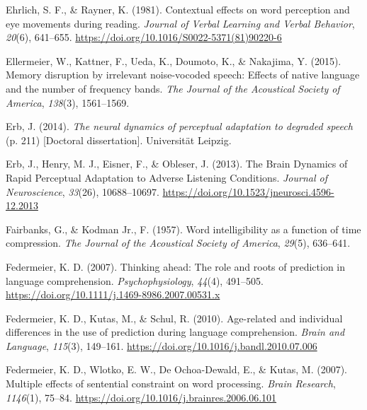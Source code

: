 \documentclass[a4paper, nobind]{templates/ociamthesis}
\newlength{\cslhangindent}
\newenvironment{CSLReferences}[2] %
 {%
  \setlength{\parindent}{0pt}
  \ifodd #1
  \let\oldpar\par
  \def\par{\hangindent=\cslhangindent\oldpar}
  \fi
  \setlength{\parskip}{1mm}
  \setlength{\baselineskip}{6mm}
 }%
 {}
\begin{document}
\begin{CSLReferences}{1}{0}
\leavevmode{}%
Ehrlich, S. F., \& Rayner, K. (1981). {Contextual effects on word perception and eye movements during reading}. \emph{Journal of Verbal Learning and Verbal Behavior}, \emph{20}(6), 641--655. \url{https://doi.org/10.1016/S0022-5371(81)90220-6}

\leavevmode{}%
Ellermeier, W., Kattner, F., Ueda, K., Doumoto, K., \& Nakajima, Y. (2015). Memory disruption by irrelevant noise-vocoded speech: Effects of native language and the number of frequency bands. \emph{The Journal of the Acoustical Society of America}, \emph{138}(3), 1561--1569.

\leavevmode{}%
Erb, J. (2014). \emph{{The neural dynamics of perceptual adaptation to degraded speech}} (p. 211) {[}Doctoral dissertation{]}. Universit{ä}t Leipzig.

\leavevmode{}%
Erb, J., Henry, M. J., Eisner, F., \& Obleser, J. (2013). The Brain Dynamics of Rapid Perceptual Adaptation to Adverse Listening Conditions. \emph{Journal of Neuroscience}, \emph{33}(26), 10688--10697. \url{https://doi.org/10.1523/jneurosci.4596-12.2013}

\leavevmode{}%
Fairbanks, G., \& Kodman Jr., F. (1957). {Word intelligibility as a function of time compression}. \emph{The Journal of the Acoustical Society of America}, \emph{29}(5), 636--641.

\leavevmode{}%
Federmeier, K. D. (2007). {Thinking ahead: The role and roots of prediction in language comprehension}. \emph{Psychophysiology}, \emph{44}(4), 491--505. \url{https://doi.org/10.1111/j.1469-8986.2007.00531.x}

\leavevmode{}%
Federmeier, K. D., Kutas, M., \& Schul, R. (2010). {Age-related and individual differences in the use of prediction during language comprehension}. \emph{Brain and Language}, \emph{115}(3), 149--161. \url{https://doi.org/10.1016/j.bandl.2010.07.006}

\leavevmode{}%
Federmeier, K. D., Wlotko, E. W., De Ochoa-Dewald, E., \& Kutas, M. (2007). {Multiple effects of sentential constraint on word processing}. \emph{Brain Research}, \emph{1146}(1), 75--84. \url{https://doi.org/10.1016/j.brainres.2006.06.101}


\end{CSLReferences}
\end{document}
